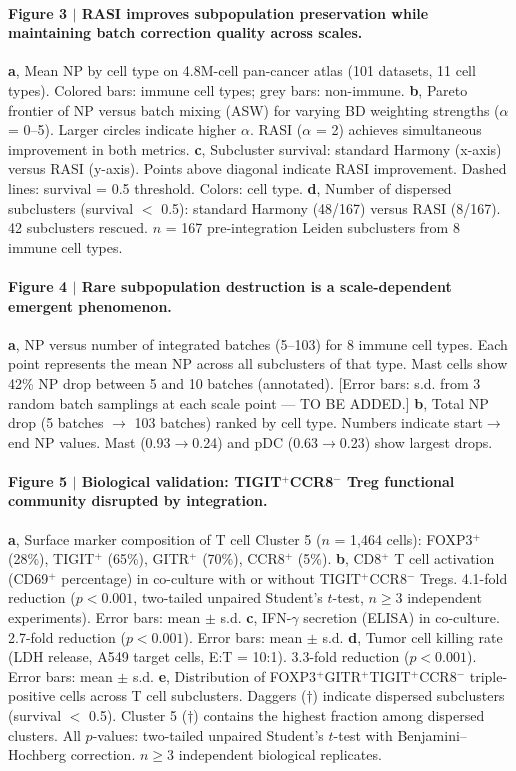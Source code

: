 \paragraph{Figure 3 $|$ RASI improves subpopulation preservation while maintaining batch correction quality across scales.}
\textbf{a}, Mean NP by cell type on 4.8M-cell pan-cancer atlas (101 datasets, 11 cell types). Colored bars: immune cell types; grey bars: non-immune.
\textbf{b}, Pareto frontier of NP versus batch mixing (ASW) for varying BD weighting strengths ($\alpha$ = 0--5). Larger circles indicate higher $\alpha$. RASI ($\alpha$ = 2) achieves simultaneous improvement in both metrics.
\textbf{c}, Subcluster survival: standard Harmony (x-axis) versus RASI (y-axis). Points above diagonal indicate RASI improvement. Dashed lines: survival = 0.5 threshold. Colors: cell type.
\textbf{d}, Number of dispersed subclusters (survival $<$ 0.5): standard Harmony (48/167) versus RASI (8/167). 42 subclusters rescued. $n$ = 167 pre-integration Leiden subclusters from 8 immune cell types.

\paragraph{Figure 4 $|$ Rare subpopulation destruction is a scale-dependent emergent phenomenon.}
\textbf{a}, NP versus number of integrated batches (5--103) for 8 immune cell types. Each point represents the mean NP across all subclusters of that type. Mast cells show 42\% NP drop between 5 and 10 batches (annotated). [Error bars: s.d. from 3 random batch samplings at each scale point — TO BE ADDED.]
\textbf{b}, Total NP drop (5 batches $\to$ 103 batches) ranked by cell type. Numbers indicate start$\to$end NP values. Mast (0.93$\to$0.24) and pDC (0.63$\to$0.23) show largest drops.

\paragraph{Figure 5 $|$ Biological validation: TIGIT$^+$CCR8$^-$ Treg functional community disrupted by integration.}
\textbf{a}, Surface marker composition of T cell Cluster 5 ($n$ = 1,464 cells): FOXP3$^+$ (28\%), TIGIT$^+$ (65\%), GITR$^+$ (70\%), CCR8$^+$ (5\%).
\textbf{b}, CD8$^+$ T cell activation (CD69$^+$ percentage) in co-culture with or without TIGIT$^+$CCR8$^-$ Tregs. 4.1-fold reduction ($p < 0.001$, two-tailed unpaired Student's $t$-test, $n \geq 3$ independent experiments). Error bars: mean $\pm$ s.d.
\textbf{c}, IFN-$\gamma$ secretion (ELISA) in co-culture. 2.7-fold reduction ($p < 0.001$). Error bars: mean $\pm$ s.d.
\textbf{d}, Tumor cell killing rate (LDH release, A549 target cells, E:T = 10:1). 3.3-fold reduction ($p < 0.001$). Error bars: mean $\pm$ s.d.
\textbf{e}, Distribution of FOXP3$^+$GITR$^+$TIGIT$^+$CCR8$^-$ triple-positive cells across T cell subclusters. Daggers ($\dagger$) indicate dispersed subclusters (survival $<$ 0.5). Cluster 5 ($\dagger$) contains the highest fraction among dispersed clusters.
All $p$-values: two-tailed unpaired Student's $t$-test with Benjamini--Hochberg correction. $n \geq 3$ independent biological replicates.
